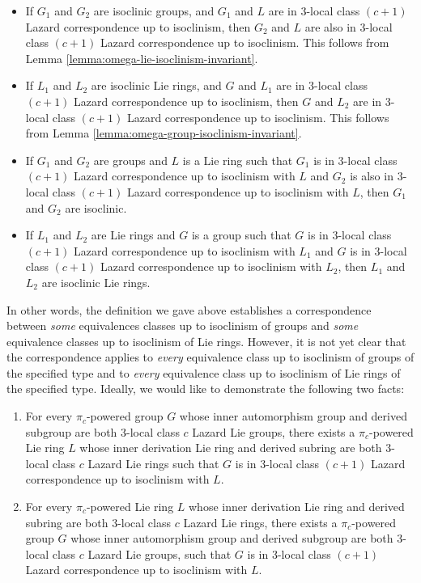 \documentclass{ucetd}
\begin{document}
\begin{itemize}
\item If $G_1$ and $G_2$ are isoclinic groups, and $G_1$ and $L$ are
  in $3$-local class $(c + 1)$ Lazard correspondence up to isoclinism,
  then $G_2$ and $L$ are also in $3$-local class $(c + 1)$ Lazard
  correspondence up to isoclinism. This follows from Lemma
  \ref{lemma:omega-lie-isoclinism-invariant}.
\item If $L_1$ and $L_2$ are isoclinic Lie rings, and $G$ and $L_1$
  are in $3$-local class $(c + 1)$ Lazard correspondence up to
  isoclinism, then $G$ and $L_2$ are in $3$-local class $(c + 1)$
  Lazard correspondence up to isoclinism. This follows from Lemma
  \ref{lemma:omega-group-isoclinism-invariant}.
\item If $G_1$ and $G_2$ are groups and $L$ is a Lie ring such that
  $G_1$ is in $3$-local class $(c + 1)$ Lazard correspondence up to
  isoclinism with $L$ and $G_2$ is also in $3$-local class $(c + 1)$ Lazard
  correspondence up to isoclinism with $L$, then $G_1$ and $G_2$ are
  isoclinic.
\item If $L_1$ and $L_2$ are Lie rings and $G$ is a group such that
  $G$ is in $3$-local class $(c + 1)$ Lazard correspondence up to isoclinism
  with $L_1$ and $G$ is in $3$-local class $(c + 1)$ Lazard correspondence
  up to isoclinism with $L_2$, then $L_1$ and $L_2$ are isoclinic Lie
  rings.
\end{itemize}

In other words, the definition we gave above establishes a
correspondence between {\em some} equivalences classes up to
isoclinism of groups and {\em some} equivalence classes up to
isoclinism of Lie rings. However, it is not yet clear that the
correspondence applies to {\em every} equivalence class up to
isoclinism of groups of the specified type and to {\em every}
equivalence class up to isoclinism of Lie rings of the specified
type. Ideally, we would like to demonstrate the following two facts:

\begin{enumerate}
\item For every $\pi_c$-powered group $G$ whose inner automorphism group
  and derived subgroup are both $3$-local class $c$ Lazard Lie groups,
  there exists a $\pi_c$-powered Lie ring $L$ whose inner derivation Lie
  ring and derived subring are both $3$-local class $c$ Lazard Lie
  rings such that $G$ is in $3$-local class $(c + 1)$ Lazard
  correspondence up to isoclinism with $L$.
\item For every $\pi_c$-powered Lie ring $L$ whose inner derivation Lie
  ring and derived subring are both $3$-local class $c$ Lazard Lie
  rings, there exists a $\pi_c$-powered group $G$ whose inner
  automorphism group and derived subgroup are both $3$-local class $c$
  Lazard Lie groups, such that $G$ is in $3$-local class $(c + 1)$
  Lazard correspondence up to isoclinism with $L$.
\end{enumerate}
\end{document}
